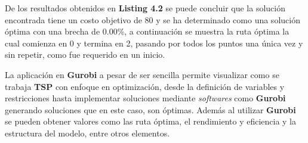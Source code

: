         \begin{center}
            
        \end{center}
        
        De los resultados obtenidos en \textbf{Listing 4.2} se puede concluir que la solución encontrada tiene un costo objetivo de 80 y se ha determinado como una solución óptima con una brecha de 0.00\%, a continuación se muestra la ruta óptima la cual comienza en 0 y termina en 2, pasando por todos los puntos una única vez y sin repetir, como fue requerido en un inicio.
        
        \begin{center}
            
        \end{center}

    La aplicación en \textbf{Gurobi} a pesar de ser sencilla permite visualizar como se trabaja \textbf{TSP} con enfoque en optimización, desde la definición de variables y restricciones hasta implementar soluciones mediante \textit{softwares} como \textbf{Gurobi} generando soluciones que en este caso, son óptimas. Además al utilizar \textbf{Gurobi} se pueden obtener valores como las ruta óptima, el rendimiento y eficiencia y la estructura del modelo, entre otros elementos.